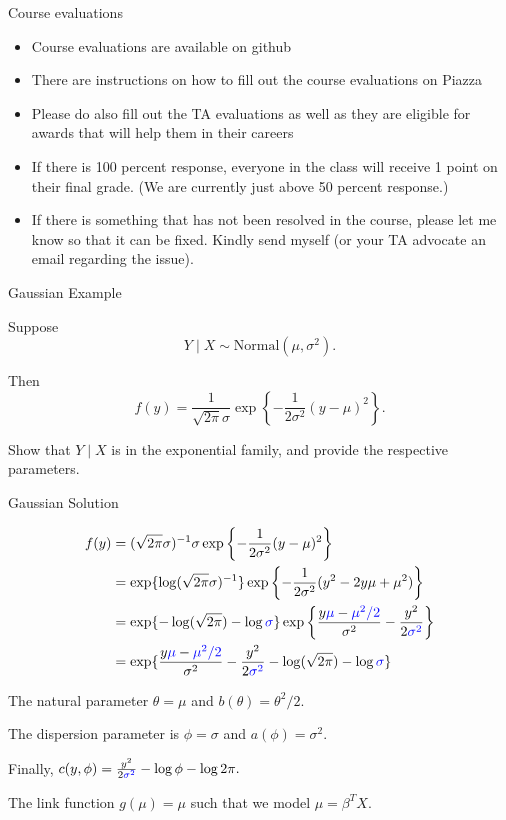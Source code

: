 \documentclass[
  ignorenonframetext,
]{beamer}
\providecommand{\tightlist}{%
  \setlength{\itemsep}{0pt}\setlength{\parskip}{0pt}}
\begin{document}
\begin{frame}{Course evaluations}
\protect\hypertarget{course-evaluations}{}

\begin{itemize}
\tightlist
\item
  Course evaluations are available on github
\item
  There are instructions on how to fill out the course evaluations on
  Piazza
\item
  Please do also fill out the TA evaluations as well as they are
  eligible for awards that will help them in their careers
\item
  If there is 100 percent response, everyone in the class will receive 1
  point on their final grade. (We are currently just above 50 percent
  response.)
\item
  If there is something that has not been resolved in the course, please
  let me know so that it can be fixed. Kindly send myself (or your TA
  advocate an email regarding the issue).
\end{itemize}

\end{frame}

\begin{frame}{Gaussian Example}
\protect\hypertarget{gaussian-example}{}

Suppose \[Y\mid X \sim \text{Normal}(\mu, \sigma^2).\]

Then \[f(y) = \frac{1}{\sqrt{2\pi}\sigma}\exp \left\{
-\frac{1}{2\sigma^2} (y- \mu)^2
\right\}.\]

Show that \(Y \mid X\) is in the exponential family, and provide the
respective parameters.

\end{frame}

\begin{frame}{Gaussian Solution}
\protect\hypertarget{gaussian-solution}{}

\begin{align}
f(y)
&= (\sqrt{2\pi}\sigma)^{-1}\sigma\exp \left\{
-\frac{1}{2\sigma^2} (y- \mu)^2
\right\} \\
&= \exp\{\log(\sqrt{2\pi}\sigma)^{-1}\}
\exp \left\{
-\frac{1}{2\sigma^2} (y^2 - 2y\mu + \mu^2)
\right\} \\
&= \exp\{-\log(\sqrt{2\pi}) - \log\textcolor{blue}{\sigma} \}
\exp \left\{
 \frac{y\textcolor{blue}{\mu} -\textcolor{blue}{\mu^2/2}}{\sigma^2} - \frac{y^2}{2\textcolor{blue}{\sigma^2}}
\right\} \\
&=
\exp \{
\frac{y\textcolor{blue}{\mu} -\textcolor{blue}{\mu^2/2}}{\sigma^2}
- \frac{y^2}{2\textcolor{blue}{\sigma^2}}
-\log(\sqrt{2\pi}) - \log\textcolor{blue}{\sigma}
\}
\end{align}

The natural parameter \(\theta = \mu\) and \(b(\theta) = \theta^2/2.\)

The dispersion parameter is \(\phi = \sigma\) and
\(a(\phi) = \sigma^2.\)

Finally,
\(c(y,\phi) = \frac{y^2}{2\textcolor{blue}{\sigma^2}} - \log \phi - \log 2\pi.\)

The link function \(g(\mu) = \mu\) such that we model
\(\mu = \beta^TX.\)

\end{frame}
\end{document}
